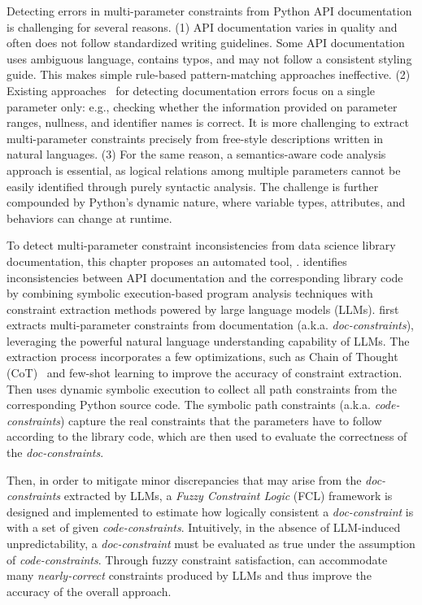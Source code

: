 Detecting errors in multi-parameter constraints from Python API documentation is challenging for
several reasons.
(1) API documentation varies in quality and often does not follow standardized writing guidelines.
Some API documentation uses ambiguous language, contains typos, and may not follow a consistent
styling guide.
This makes simple rule-based pattern-matching approaches ineffective.
(2) Existing approaches~\cite{ratol2017detecting, liu2020automating} for detecting documentation errors focus on a single parameter
only: e.g., checking whether the information provided on parameter ranges, nullness, and identifier
names is correct.
It is more challenging to extract multi-parameter constraints precisely from free-style descriptions
written in natural languages.
(3) For the same reason, a semantics-aware code analysis approach is essential, as logical relations among
multiple parameters cannot be easily identified through purely syntactic analysis. The challenge is further compounded by Python's dynamic nature, where variable types, attributes, and behaviors can change at runtime.



To detect multi-parameter constraint inconsistencies from data science library documentation, this chapter proposes an automated tool, \toolchecker.
\toolchecker identifies inconsistencies between API documentation and the corresponding library code by
combining symbolic execution-based program analysis techniques with constraint extraction methods
powered by large language models (LLMs).
\toolchecker first extracts multi-parameter constraints from documentation (a.k.a. \emph{doc-constraints}),
leveraging the powerful natural language understanding capability of LLMs.
The extraction process incorporates a few optimizations, such as Chain of Thought (CoT)~\cite{wei2022chain} and few-shot
learning to improve the accuracy of constraint extraction.
Then \toolchecker uses dynamic symbolic execution to collect all path constraints from the corresponding
Python source code.
The symbolic path constraints (a.k.a. \emph{code-constraints}) capture the real constraints that
the parameters have to follow according to the library code, which are then used to evaluate the
correctness of the \emph{doc-constraints}.


Then, in order to mitigate minor discrepancies that may arise from the \emph{doc-constraints} extracted by
LLMs, a \emph{Fuzzy Constraint Logic} (FCL) framework is designed and implemented to estimate how
logically consistent a \emph{doc-constraint} is with a set of given \emph{code-constraints}.
Intuitively, in the absence of LLM-induced unpredictability, a \emph{doc-constraint} must be evaluated as true
under the assumption of \emph{code-constraints}.
Through fuzzy constraint satisfaction, \toolchecker can accommodate many \emph{nearly-correct} constraints
produced by LLMs and thus improve the accuracy of the overall approach.



